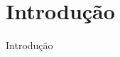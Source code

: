 \section{Introdução}
\label{s.introduction}


\begin{frame}{Introdução}
\end{frame}

\begin{frame}
\end{frame}